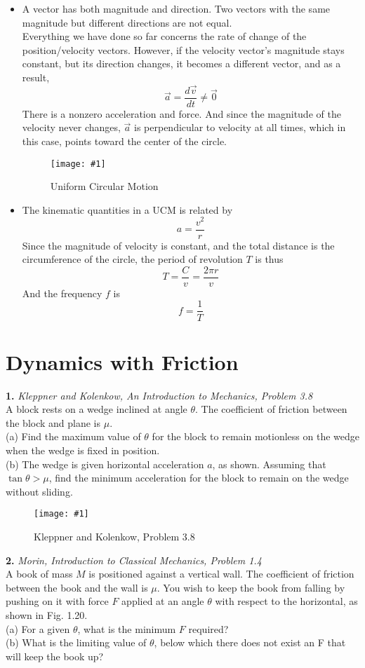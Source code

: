 \documentclass[11pt]{article}
\newcommand{\fig}[4]{
    \begin{figure}[H]
        \centering
        \texttt{[image: \#1]}
        \caption{#2}
        \label{exp4fit}
    \end{figure}
}
\theoremstyle{gangnamstyle}{\newtheorem{definition}{Definition}[]}
\theoremstyle{gangnamstyle}{\newtheorem{example}{Example}[]}
\theoremstyle{gangnamstyle}{\newtheorem{problem}{Problem}[]}
\begin{document}
\begin{itemize}
\item A vector has both magnitude and direction. Two vectors with the same magnitude but different directions are not equal. \\

Everything we have done so far concerns the rate of change of the position/velocity vectors. However, if the velocity vector's magnitude stays constant, but its direction changes, it becomes a different vector, and as a result, 
\[ \Vec{a} = \frac{d\Vec{v}}{dt} \neq \Vec{0} \]
There is a nonzero acceleration and force. And since the magnitude of the velocity never changes, $\Vec{a}$ is perpendicular to velocity at all times, which in this case, points toward the center of the circle. 

\fig{figs/0627/ucm.png}{Uniform Circular Motion}{0.5}{0}

\pagebreak

\item The kinematic quantities in a UCM is related by
\[ a = \frac{v^2}{r} \]
Since the magnitude of velocity is constant, and the total distance is the circumference of the circle, the period of revolution $T$ is thus
\[ T = \frac{C}{v} = \frac{2\pi r}{v} \]
And the frequency $f$ is
\[ f = \frac{1}{T} \]
\end{itemize}

\pagebreak

\section{Dynamics with Friction}

\textbf{1.} \textit{Kleppner and Kolenkow, An Introduction to Mechanics, Problem 3.8} \\
A block rests on a wedge inclined at angle $\theta$. The coefficient of friction between the block and plane is $\mu$. \\
(a) Find the maximum value of $\theta$ for the block to remain motionless on the wedge when the wedge is fixed in position. \\
(b) The wedge is given horizontal acceleration $a$, as shown. Assuming that $\tan\theta > \mu$, find the minimum acceleration for the block to remain on the wedge without sliding.
\fig{figs/0627/kk38.png}{Kleppner and Kolenkow, Problem 3.8}{0.65}{0}

\pagebreak

\textbf{2.} \textit{Morin, Introduction to Classical Mechanics, Problem 1.4} \\
A book of mass $M$ is positioned against a vertical wall. The coefficient of friction between the book and the wall is $\mu$. You wish to keep the book from falling by pushing on it with force $F$ applied at an angle $\theta$ with respect to
the horizontal, as shown in Fig. 1.20. \\
(a) For a given $\theta$, what is the minimum $F$ required? \\
(b) What is the limiting value of $\theta$, below which there does not exist an F that will keep the book up? \\
\end{document}
